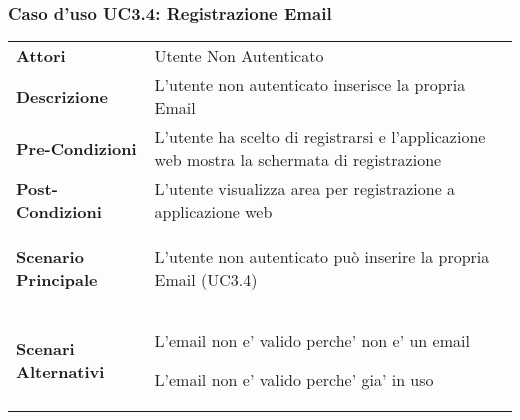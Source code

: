 \subsubsection{Caso d'uso UC3.4:  Registrazione Email}
\label{UC3_4}

\begin{longtable}{ l | p{11cm}}
	\hline
	\rowcolor{Gray}
	 \multicolumn{2}{c}{UC3.4 - Inserimento Email} \\
	 \hline
	\textbf{Attori} & Utente Non Autenticato \\
	\textbf{Descrizione} & L'utente non autenticato inserisce la propria Email  \\
	\textbf{Pre-Condizioni} & L'utente ha scelto di registrarsi e l'applicazione web mostra la schermata di registrazione \\
	\textbf{Post-Condizioni} & L'utente visualizza area per registrazione a applicazione web \\
	\textbf{Scenario Principale} & \begin{enumerate*}[label=(\arabic*.),itemjoin={\newline}]
		\item L'utente non autenticato può inserire la propria Email (UC3.4)
	\end{enumerate*}\\
	\textbf{Scenari Alternativi} & 
	\begin{enumerate*}[label=(\arabic*.),itemjoin={\newline}]
		\item L'email non e' valido perche' non e' un email
		\item L'email non e' valido perche' gia' in uso
	\end{enumerate*}\\
\end{longtable}
